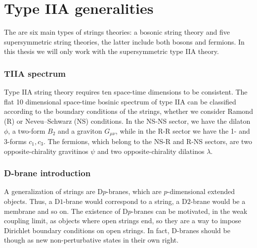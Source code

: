 \chapter{Type IIA generalities}

The are six main types of strings theories: a bosonic string theory and five supersymmetric 
string theories, the latter include both bosons and fermions.
In this thesis we will only work with the supersymmetric type IIA theory. 

\subsection{TIIA spectrum}
Type IIA string theory requires ten space-time dimensions to be consistent.
The flat 10 dimensional space-time bosinic spectrum of type IIA can be classified according to
the boundary conditions of the strings, whether we consider Ramond (R) or Neveu–Schwarz (NS) conditions.
In the NS-NS sector, we have the dilaton $\phi$, a two-form $B_2$ and a graviton $G_{\mu\nu}$,
while in the R-R sector we have the 1- and 3-forms $c_1, c_3$.
The fermions, which belong to the NS-R and R-NS sectors, are two opposite-chirality gravitinos $\psi$ and two opposite-chirality dilatinos $\lambda$.

\subsection{D-brane introduction}

A generalization of strings are D$p$-branes, which are $p$-dimensional extended objects.
Thus, a D$1$-brane would correspond to a string, a D$2$-brane would be a membrane and so on.
The existence of D$p$-branes can be motivated, in the weak coupling limit, as 
objects where open strings end, so they are a way to impose Dirichlet boundary conditions on open strings.
In fact, D-branes should be though as new non-perturbative states in their own right.

